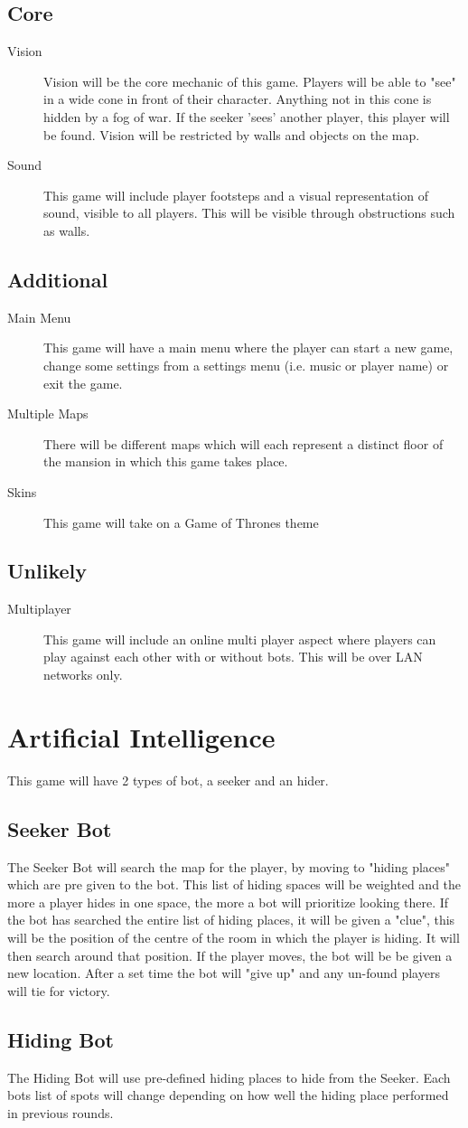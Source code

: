 \documentclass[]{report}
\begin{document}
\subsection{Core}
\begin{description}
	\item[Vision] Vision will be the core mechanic of this game. Players will be able to "see" in a wide cone in front of their character. Anything not in this cone is hidden by a fog of war. If the seeker 'sees' another player, this player will be found. Vision will be restricted by walls and objects on the map.
	\item[Sound] This game will include player footsteps and a visual representation of sound, visible to all players. This will be visible through obstructions such as walls.
\end{description}
\subsection{Additional}
\begin{description}
	\item[Main Menu] This game will have a main menu where the player can start a new game, change some settings from a settings menu (i.e. music or player name) or exit the game. 
	\item[Multiple Maps] There will be different maps which will each represent a distinct floor of the mansion in which this game takes place.	
	\item[Skins] This game will take on a Game of Thrones theme
\end{description}
\subsection{Unlikely}
\begin{description}
	\item[Multiplayer] This game will include an online multi player aspect where players can play against each other with or without bots. This will be over LAN networks only.
\end{description}

\section{Artificial Intelligence}
This game will have 2 types of bot, a seeker and an hider.
\subsection{Seeker Bot}
The Seeker Bot will search the map for the player, by moving to "hiding places" which are pre given to the bot. This list of hiding spaces will be weighted and the more a player hides in one space, the more a bot will prioritize looking there. If the bot has searched the entire list of hiding places, it will be given a "clue", this will be the position of the centre of the room in which the player is hiding. It will then search around that position. If the player moves, the bot will be be given a new location. After a set time the bot will "give up" and any un-found players will tie for victory.

\subsection{Hiding Bot}
The Hiding Bot will use pre-defined hiding places to hide from the Seeker. Each bots list of spots will change depending on how well the hiding place performed in previous rounds.
\end{document}
